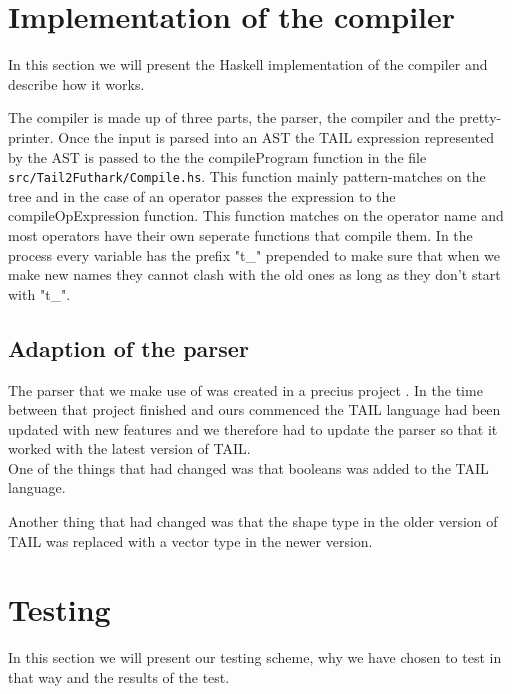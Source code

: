 \documentclass[11pt]{article}
\begin{document}
\section{Implementation of the compiler}

In this section we will present the Haskell implementation of the compiler and describe how it works.

The compiler is made up of three parts, the parser, the compiler and the pretty-printer. Once the input is parsed into an AST the
TAIL expression represented by the AST is passed to the the compileProgram function in the file {\tt src/Tail2Futhark/Compile.hs}.
This function mainly pattern-matches on the tree and in the case of an operator passes the expression to the compileOpExpression
function.
This function matches on the operator name and most operators have their own seperate functions that compile them.
In the process every variable has the prefix "t\_" prepended to make sure that when we make new names they cannot clash
with the old ones as long as they don't start with "t\_".

\subsection{Adaption of the parser}

The parser that we make use of was created in a precius project \cite{APLACC}. In the time between that project finished and ours commenced the TAIL language had been updated with new features and we therefore had to update the parser so that it worked with the latest version of TAIL.\\

One of the things that had changed was that booleans was added to the TAIL language. %

Another thing that had changed was that the shape type in the older version of TAIL was replaced with a vector type in the newer version.\\

\section{Testing}
In this section we will present our testing scheme, why we have chosen to test in that way and the results of the test.\\
\end{document}
